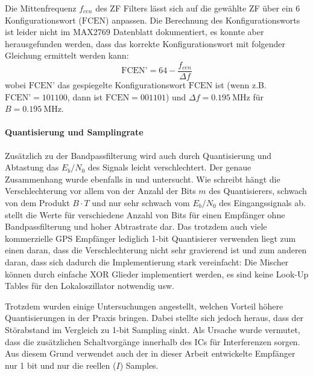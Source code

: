 Die Mittenfrequenz $f_{cen}$ des ZF Filters lässt sich auf die gewählte ZF über ein \SI{6}{\bit} Konfigurationswort ($\textrm{FCEN}$) anpassen. Die Berechnung des Konfigurationsworts ist leider nicht im MAX2769 Datenblatt dokumentiert, es konnte aber herausgefunden werden, dass das korrekte Konfigurationswort mit folgender Gleichung ermittelt werden kann: 
\begin{equation}
    \textrm{FCEN'} = 64 - \frac{f_{cen}}{\Delta f}
\end{equation}
wobei $\textrm{FCEN'}$ das gespiegelte Konfigurationswort $\textrm{FCEN}$ ist (wenn z.B. $\textrm{FCEN'}=101100$, dann ist $\textrm{FCEN}=001101$) und $\Delta f=\SI{0.195}{\MHz}$  für $B=\SI{0.195}{\MHz}$.

\paragraph{Quantisierung und Samplingrate}
Zusätzlich zu der Bandpassfilterung wird auch durch Quantisierung und Abtastung das $E_b/N_0$  des Signals leicht verschlechtert. Der genaue Zusammenhang wurde ebenfalls in \cite{hegarty2011analytical} und \cite{itc1982chang} untersucht. Wie \cite{itc1982chang} schreibt hängt die Verschlechterung vor allem von der Anzahl der Bits $m$ des Quantisierers, schwach von dem Produkt $B\cdot T$ und nur sehr schwach vom $E_b/N_0$ des Eingangssignals ab.  stellt die Werte für verschiedene Anzahl von Bits für einen Empfänger ohne Bandpassfilterung und hoher Abtrastrate dar. Das trotzdem auch viele kommerzielle GPS Empfänger lediglich 1-bit Quantisierer verwenden liegt zum einen daran, dass die Verschlechterung nicht sehr gravierend ist und zum anderen daran, dass sich dadurch die Implementierung stark vereinfacht: Die Mischer können durch einfache XOR Glieder implementiert werden, es sind keine Look-Up Tables für den Lokaloszillator notwendig usw. 

Trotzdem wurden einige Untersuchungen angestellt, welchen Vorteil höhere Quantisierungen in der Praxis bringen. Dabei stellte sich jedoch heraus, dass der Störabstand im Vergleich zu 1-bit Sampling sinkt. Als Ursache wurde vermutet, dass die zusätzlichen Schaltvorgänge innerhalb des ICs für Interferenzen sorgen. Aus diesem Grund verwendet auch der in dieser Arbeit entwickelte Empfänger nur 1 bit und nur die reellen ($I$) Samples.


